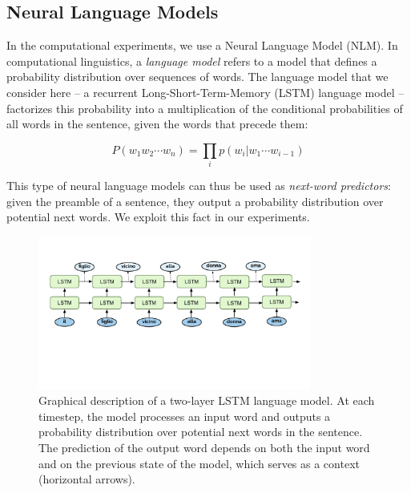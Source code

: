\subsection{Neural Language Models}
In the computational experiments, we use a Neural Language Model (NLM).
In computational linguistics, a \emph{language model} refers to a model that defines a probability distribution over sequences of words.
The language model that we consider here -- a recurrent Long-Short-Term-Memory (LSTM) language model \citep{Hochreiter:Schmidhuber:1997,Graves:2012} -- factorizes this probability into a multiplication of the conditional probabilities of all words in the sentence, given the words that precede them:

\begin{equation}
    P(w_1 w_2 \cdots w_n) = \prod_i p(w_i|w_1 \cdots w_{i-1})
\end{equation}

This type of neural language models can thus be used as \emph{next-word predictors}: given the preamble of a sentence, they output a probability distribution over potential next words.
We exploit this fact in our experiments.

\begin{figure}
    \centering
    \includegraphics[width=0.8\textwidth, clip, trim={10mm 50mm 10mm 20mm}]{figures/LM-image}
    \caption{Graphical description of a two-layer LSTM language model. At each timestep, the model processes an input word and outputs a probability distribution over potential next words in the sentence. The prediction of the output word depends on both the input word and on the previous state of the model, which serves as a context (horizontal arrows).} 
\end{figure}

